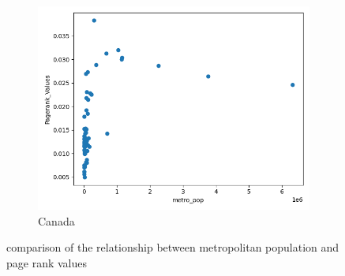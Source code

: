 \begin{figure}[H]
     \hfill
     \begin{subfigure}[b]{0.3\textwidth}
         \centering
         \includegraphics[width=\textwidth]{images/comparison/CANADA/relationship_metro_pop_vs_Pagerank_Values_CANADA.png}
         \caption{Canada}
         \label{fig:metro-page-canada}
     \end{subfigure}
        \caption{comparison of the relationship between metropolitan population and page rank values}
        \label{fig:metro-page}
\end{figure}